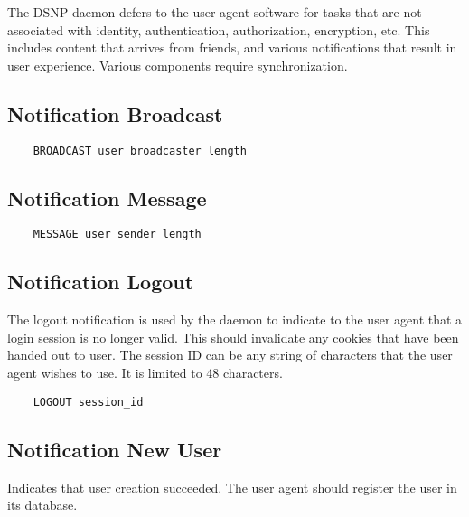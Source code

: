 \documentclass[letterpaper,11pt,oneside]{article}
\begin{document}
The DSNP daemon defers to the user-agent software for tasks that are not
associated with identity, authentication, authorization, encryption, etc. This
includes content that arrives from friends, and various notifications that
result in user experience. Various components require synchronization.

\subsection{Notification Broadcast}

\vspace{10pt}
\begin{verbatim}
    BROADCAST user broadcaster length 
\end{verbatim}
\vspace{10pt}

\subsection{Notification Message}

\vspace{10pt}
\begin{verbatim}
    MESSAGE user sender length 
\end{verbatim}
\vspace{10pt}

\subsection{Notification Logout}

The logout notification is used by the daemon to indicate to the user agent
that a login session is no longer valid. This should invalidate any cookies
that have been handed out to user. The session ID can be any string of
characters that the user agent wishes to use. It is limited to 48 characters.

\vspace{10pt}
\begin{verbatim}
    LOGOUT session_id
\end{verbatim}
\vspace{10pt}

\subsection{Notification New User}

Indicates that user creation succeeded. The user agent should register the user
in its database.
\end{document}
